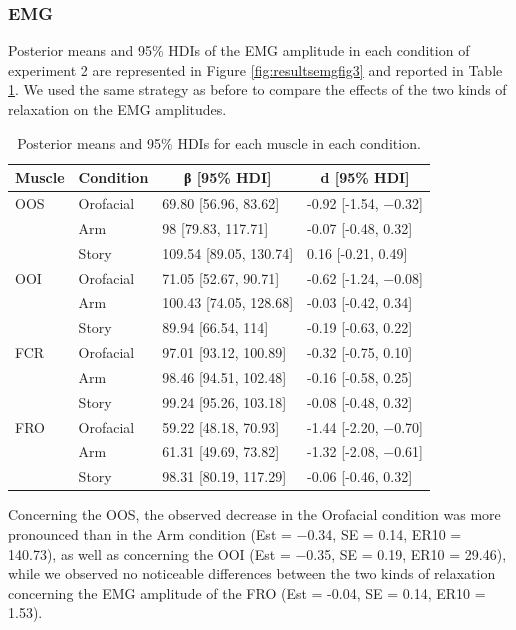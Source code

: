 \documentclass[a4paper,12pt,twoside,openright,oldfontcommands,final]{memoir}
\begin{document}
\hypertarget{emg-1}{%
\subsubsection{EMG}\label{emg-1}}

Posterior means and 95\% HDIs of the EMG amplitude in each condition of experiment 2 are represented in Figure \ref{fig:resultsemgfig3} and reported in Table \ref{tab:table3}. We used the same strategy as before to compare the effects of the two kinds of relaxation on the EMG amplitudes.

\begin{table}[H]
\begin{center}
\begin{threeparttable}
\caption{\label{tab:table3}Posterior means and 95\% HDIs for each muscle in each condition.}
\small{
\begin{tabular}{llll}
\toprule
Muscle & \multicolumn{1}{c}{Condition} & \multicolumn{1}{c}{β [95\% HDI]} & \multicolumn{1}{c}{d [95\% HDI]}\\
\midrule
OOS & Orofacial & 69.80 [56.96, 83.62] & -0.92 [-1.54, −0.32]\\
 & Arm & 98 [79.83, 117.71] & -0.07 [-0.48, 0.32]\\
 & Story & 109.54 [89.05, 130.74] & 0.16 [-0.21, 0.49]\\
OOI & Orofacial & 71.05 [52.67, 90.71] & -0.62 [-1.24, −0.08]\\
 & Arm & 100.43 [74.05, 128.68] & -0.03 [-0.42, 0.34]\\
 & Story & 89.94 [66.54, 114] & -0.19 [-0.63, 0.22]\\
FCR & Orofacial & 97.01 [93.12, 100.89] & -0.32 [-0.75, 0.10]\\
 & Arm & 98.46 [94.51, 102.48] & -0.16 [-0.58, 0.25]\\
 & Story & 99.24 [95.26, 103.18] & -0.08 [-0.48, 0.32]\\
FRO & Orofacial & 59.22 [48.18, 70.93] & -1.44 [-2.20, −0.70]\\
 & Arm & 61.31 [49.69, 73.82] & -1.32 [-2.08, −0.61]\\
 & Story & 98.31 [80.19, 117.29] & -0.06 [-0.46, 0.32]\\
\bottomrule
\end{tabular}
}
\end{threeparttable}
\end{center}
\end{table}

Concerning the OOS, the observed decrease in the Orofacial condition was more pronounced than in the Arm condition (Est = −0.34, SE = 0.14, ER10 = 140.73), as well as concerning the OOI (Est = −0.35, SE = 0.19, ER10 = 29.46), while we observed no noticeable differences between the two kinds of relaxation concerning the EMG amplitude of the FRO (Est = -0.04, SE = 0.14, ER10 = 1.53).
\end{document}

